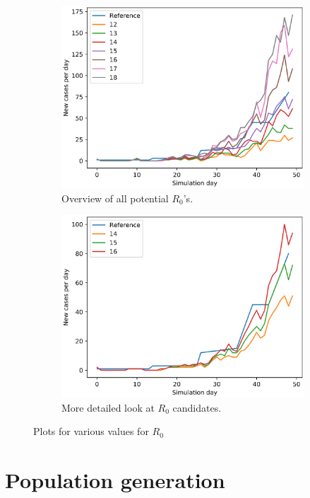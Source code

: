 \documentclass[runningheads]{llncs}
\begin{document}
\begin{figure}[H]
	\centering
	\begin{subfigure}[b]{0.7\linewidth}
		\includegraphics[width=\textwidth]{R0_all_20runs.eps}
		\caption{Overview of all potential $R_0$'s.} 	
	\end{subfigure}
	\begin{subfigure}[b]{0.7\linewidth}
		\includegraphics[width=\textwidth]{R0_detail_30runs.eps}
		\caption{More detailed look at $R_0$ candidates.} 
	\end{subfigure}
	\caption{Plots for various values for $R_0$}
	\label{R0EstPlot}
\end{figure}

\section{Population generation}
\end{document}
